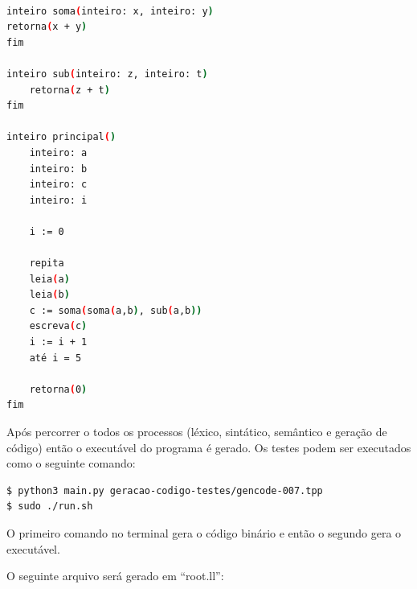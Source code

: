 \documentclass[12pt]{article}
\begin{document}
\begin{lstlisting}[language=bash, caption=Programa na linguagem tpp] 

inteiro soma(inteiro: x, inteiro: y)
retorna(x + y)
fim

inteiro sub(inteiro: z, inteiro: t)
	retorna(z + t)
fim

inteiro principal()
	inteiro: a
	inteiro: b
	inteiro: c
	inteiro: i
	
	i := 0
	
	repita
	leia(a)
	leia(b)
	c := soma(soma(a,b), sub(a,b))
	escreva(c)
	i := i + 1
	até i = 5
	
	retorna(0)
fim
\end{lstlisting}

Após percorrer o todos os processos (léxico, sintático, semântico e geração de código) então o executável do programa é gerado.
Os testes podem ser executados como o seguinte comando: 
\begin{lstlisting}[language=bash, caption=Execução do códgio tpp no terminal]
$ python3 main.py geracao-codigo-testes/gencode-007.tpp 
$ sudo ./run.sh
\end{lstlisting}
O primeiro comando no terminal gera o código binário e então o segundo gera o executável.  

O seguinte arquivo será gerado em ``root.ll'':  
\end{document}
